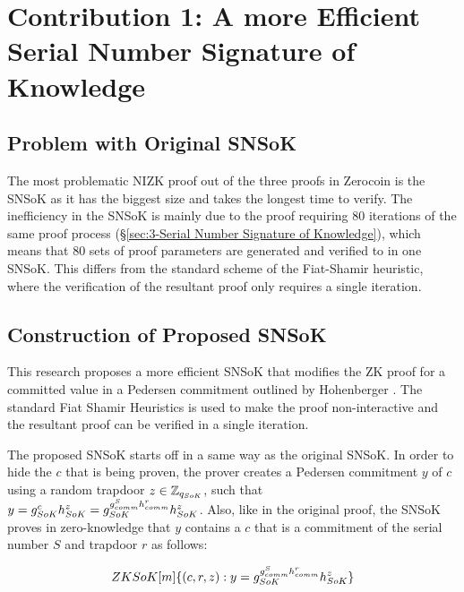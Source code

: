 \ifpdf
\graphicspath{{Chapter5/Figs/}}
\else
\graphicspath{{Chapter5/Figs/}}
\fi

\chapter{Contribution 1: A more Efficient Serial Number Signature of Knowledge}
\label{ch:Contribution 1: A more Efficient Serial Number Signature of Knowledge}
\section{Problem with Original SNSoK}
\label{sec:5-Problem with Original SNSoK}
The most problematic NIZK proof out of the three proofs in Zerocoin is the SNSoK as it has the biggest size and takes the longest time to verify. The inefficiency in the SNSoK is mainly due to the proof requiring 80 iterations of the same proof process (\S\ref{sec:3-Serial Number Signature of Knowledge}), which means that 80 sets of proof parameters are generated and verified to in one SNSoK. This differs from the standard scheme of the Fiat-Shamir heuristic, where the verification of the resultant proof only requires a single iteration.

\section{Construction of Proposed SNSoK}
\label{sec:5-Construction of Proposed SNSoK}
This research proposes a more efficient SNSoK that modifies the ZK proof for a committed value in a Pedersen commitment outlined by Hohenberger \cite{Hohenberger2002}. The standard Fiat Shamir Heuristics is used to make the proof non-interactive and the resultant proof can be verified in a single iteration.

The proposed SNSoK starts off in a same way as the original SNSoK. In order to hide the \kwCoin{} $c$ that is being proven, the prover creates a Pedersen commitment $y$ of $c$ using a random trapdoor $z\in\mathbb{Z}_{q_{SoK}}$, such that $y=g_{SoK}^{c}h_{SoK}^{z}=g_{SoK}^{g_{comm}^{S}h_{comm}^{r}}h_{SoK}^{z}$. Also, like in the original proof, the SNSoK proves in zero-knowledge that $y$ contains a $c$ that is a commitment of the serial number $S$ and trapdoor $r$ as follows:

$$ZKSoK[m]\{(c,r,z):y=g_{SoK}^{g_{comm}^{S}h_{comm}^{r}}h_{SoK}^{z}\}$$

